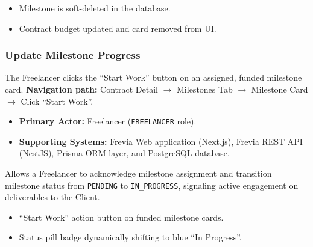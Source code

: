 \begin{itemize}[leftmargin=1.6em,topsep=3pt,itemsep=2pt,parsep=0pt,label=$\bullet$]
      \item Milestone is soft-deleted in the database.
      \item Contract budget updated and card removed from UI.
\end{itemize}

\subsubsection{ Update Milestone Progress}

The Freelancer clicks the ``Start Work'' button on an assigned, funded milestone card.\newline
\textbf{Navigation path:} Contract Detail $\rightarrow$ Milestones Tab $\rightarrow$ Milestone Card $\rightarrow$ Click ``Start Work''.


\begin{itemize}[leftmargin=1.6em,topsep=3pt,itemsep=2pt,parsep=0pt,label=$\bullet$]
      \item \textbf{Primary Actor:} Freelancer (\texttt{FREELANCER} role).
      \item \textbf{Supporting Systems:} Frevia Web application (Next.js), Frevia REST API (NestJS), Prisma ORM layer, and PostgreSQL database.
\end{itemize}

\noindent Allows a Freelancer to acknowledge milestone assignment and transition milestone status from \texttt{PENDING} to \texttt{IN\_PROGRESS}, signaling active engagement on deliverables to the Client.

\begin{itemize}[leftmargin=1.6em,topsep=3pt,itemsep=2pt,parsep=0pt,label=$\bullet$]
      \item ``Start Work'' action button on funded milestone cards.
      \item Status pill badge dynamically shifting to blue ``In Progress''.
\end{itemize}

